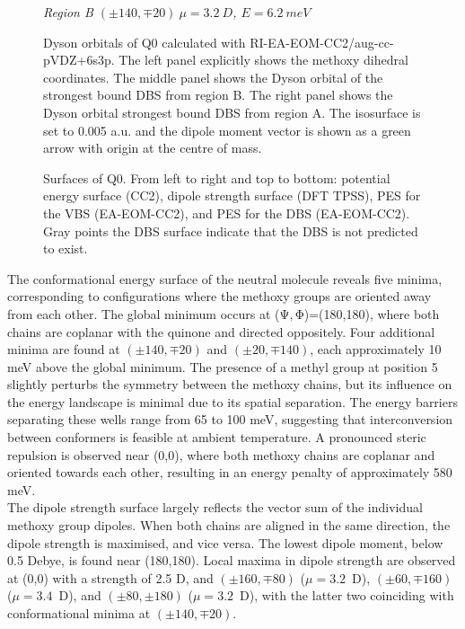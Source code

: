 \begin{figure}[b!]
\begin{minipage}[b]{0.30\textwidth}
      \small\emph{Region B $(\pm140,\mp20)~\mu=3.2~D$, $E=6.2~meV$}
  \end{minipage}
  \caption[Dyson orbitals of Q0]{Dyson orbitals of Q0 calculated with RI-EA-EOM-CC2/aug-cc-pVDZ+6s3p. The left panel explicitly shows the methoxy dihedral coordinates. The middle panel shows the Dyson orbital of the strongest bound DBS from region B. The right panel shows the Dyson orbital strongest bound DBS from region A. The isosurface is set to 0.005 a.u. and the dipole moment vector is shown as a green arrow with origin at the centre of mass.}
  \label{fig:Q0_dyson}
\end{figure}

\begin{figure}[b!]
  \centering
  \small
   
  \caption[Surfaces of Q0]{Surfaces of Q0. From left to right and top to bottom: potential energy surface (CC2), dipole strength surface (DFT TPSS), PES for the VBS (EA-EOM-CC2), and PES for the DBS (EA-EOM-CC2). Gray points the DBS surface indicate that the DBS is not predicted to exist.\label{fig:Q0_maps}}
\end{figure}

The conformational energy surface of the neutral molecule reveals five minima, corresponding to configurations where the methoxy groups are oriented away from each other. The global minimum occurs at ($\mathrm{\Psi,\Phi}$)=(180,180), where both chains are coplanar with the quinone and directed oppositely. Four additional minima are found at $\mathrm{(\pm140,\mp20)}$ and $\mathrm{(\pm20,\mp140)}$, each approximately 10 meV above the global minimum. The presence of a methyl group at position 5 slightly perturbs the symmetry between the methoxy chains, but its influence on the energy landscape is minimal due to its spatial separation. The energy barriers separating these wells range from 65 to 100 meV, suggesting that interconversion between conformers is feasible at ambient temperature. A pronounced steric repulsion is observed near (0,0), where both methoxy chains are coplanar and oriented towards each other, resulting in an energy penalty of approximately 580 meV.\\

The dipole strength surface largely reflects the vector sum of the individual methoxy group dipoles. When both chains are aligned in the same direction, the dipole strength is maximised, and vice versa. The lowest dipole moment, below 0.5 Debye, is found near (180,180). Local maxima in dipole strength are observed at (0,0) with a strength of 2.5 D, and $\mathrm{(\pm160,\mp80)}$ ($\mu=3.2$~D), $\mathrm{(\pm60,\mp160)}$ ($\mu=3.4$~D), and $\mathrm{(\pm80,\pm180)}$ ($\mu=3.2$~D), with the latter two coinciding with conformational minima at $\mathrm{(\pm140,\mp20)}$.\\

